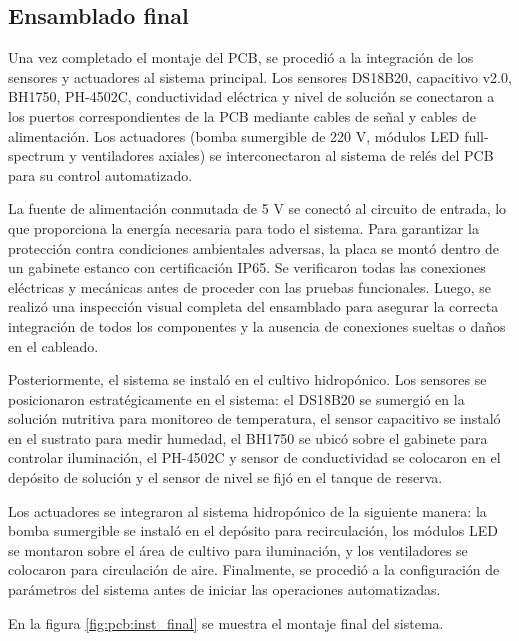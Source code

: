 \subsection{Ensamblado final}
Una vez completado el montaje del PCB, se procedió a la integración de los sensores y actuadores al sistema principal. Los sensores DS18B20, capacitivo v2.0, BH1750, PH-4502C, conductividad eléctrica y nivel de solución se conectaron a los puertos correspondientes de la PCB mediante cables de señal y cables de alimentación. Los actuadores (bomba sumergible de 220 V, módulos LED full-spectrum y ventiladores axiales) se interconectaron al sistema de relés del PCB para su control automatizado.

La fuente de alimentación conmutada de 5 V se conectó al circuito de entrada, lo que proporciona la energía necesaria para todo el sistema. Para garantizar la protección contra condiciones ambientales adversas, la placa se montó dentro de un gabinete estanco con certificación IP65. Se verificaron todas las conexiones eléctricas y mecánicas antes de proceder con las pruebas funcionales. Luego, se realizó una inspección visual completa del ensamblado para asegurar la correcta integración de todos los componentes y la ausencia de conexiones sueltas o daños en el cableado.

Posteriormente, el sistema se instaló en el cultivo hidropónico. Los sensores se posicionaron estratégicamente en el sistema: el DS18B20 se sumergió en la solución nutritiva para monitoreo de temperatura, el sensor capacitivo se instaló en el sustrato para medir humedad, el BH1750 se ubicó sobre el gabinete para controlar iluminación, el PH-4502C y sensor de conductividad se colocaron en el depósito de solución y el sensor de nivel se fijó en el tanque de reserva.

Los actuadores se integraron al sistema hidropónico de la siguiente manera: la bomba sumergible se instaló en el depósito para recirculación, los módulos LED se montaron sobre el área de cultivo para iluminación, y los ventiladores se colocaron para circulación de aire. Finalmente, se procedió a la configuración de parámetros del sistema antes de iniciar las operaciones automatizadas.

En la figura \ref{fig:pcb:inst_final} se muestra el montaje final del sistema.

